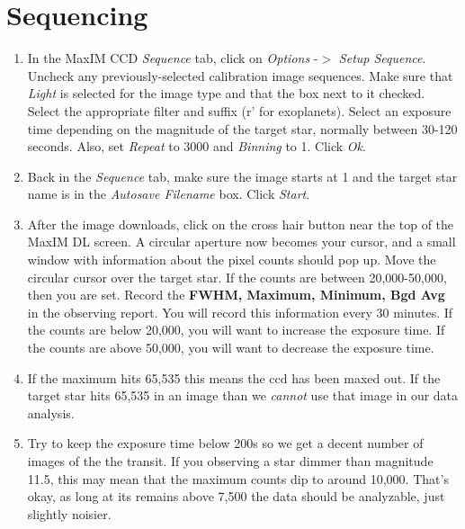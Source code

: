 \documentclass[11pt]{report}
\begin{document}
\section{Sequencing}

\begin{enumerate}
\item In the MaxIM CCD \emph{Sequence} tab, click on \emph{Options} -{$>$} \emph{Setup Sequence}. Uncheck any previously-selected calibration image sequences. Make sure that \emph{Light} is selected for the image type and that the box next to it checked. Select the appropriate filter and suffix (r' for exoplanets). Select an exposure time depending on the magnitude of the target star, normally between 30-120 seconds. Also, set \emph{Repeat} to 3000 and \emph{Binning} to 1. Click \emph{Ok}.
\item Back in the \emph{Sequence} tab, make sure the image starts at 1 and the target star name is in the \emph{Autosave Filename} box. Click \emph{Start}.
\item After the image downloads, click on the cross hair button near the top of the MaxIM DL screen. A circular aperture now becomes your cursor, and a small window with information about the pixel counts should pop up. Move the circular cursor over the target star. If the counts are between 20,000-50,000, then you are set. Record the {\bf FWHM, Maximum, Minimum, Bgd Avg} in the observing report. You will record this information every 30 minutes. If the counts are below 20,000, you will want to increase the exposure time. If the counts are above 50,000, you will want to decrease the exposure time. 
\item If the maximum hits 65,535 this means the ccd has been maxed out. If the target star hits 65,535 in an image than we \emph{cannot} use that image in our data analysis. 
\item Try to keep the exposure time below 200s so we get a decent number of images of the the transit. If you observing a star dimmer than magnitude 11.5, this may mean that the maximum counts dip to around 10,000. That's okay, as long at its remains above 7,500 the data should be analyzable, just slightly noisier. 
\end{enumerate}
\end{document}
